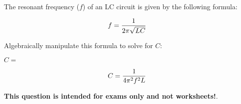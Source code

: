 

The resonant frequency ($f$) of an LC circuit is given by the following formula:

$$f = {1 \over {2 \pi \sqrt{LC}}}$$

Algebraically manipulate this formula to solve for $C$:

\vskip 20pt

$C = $







$$C = {1 \over {4 \pi^2 f^2 L}}$$







{\bf This question is intended for exams only and not worksheets!}.



